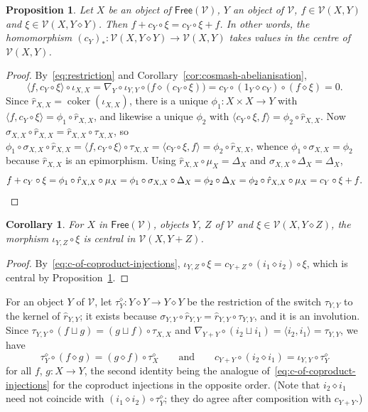 \documentclass[reqno,a4paper]{amsart}
\theoremstyle{plain}
\newtheorem{proposition}[subsection]{Proposition}
\newtheorem{corollary}[subsection]{Corollary}
\theoremstyle{definition}
\newcommand{\V}{\ensuremath{\mathcal{V}}}
\newcommand{\Free}{\ensuremath{\mathsf{Free}}}
\DeclareMathOperator{\coker}{coker}
\newcommand{\cosmash}{\ensuremath{\diamond}}
\newcommand{\cosum}{\ensuremath{\sqcup}}                   %
\newcommand{\cm}[2]{\ensuremath{\hat{r}_{#1,#2}}}          %
\newcommand{\cc}[1]{\ensuremath{c_{#1}}}                    %
\newcommand{\tw}[2]{\ensuremath{\tau_{#1,#2}}}             %
\newcommand{\twp}[2]{\ensuremath{\sigma_{#1,#2}}}          %
\newcommand{\swc}[1]{\ensuremath{\tau^{\cosmash}_{#1}}}          %
\newcommand{\fold}[1]{\ensuremath{\nabla_{#1}}}            %
\newcommand{\diag}[1]{\ensuremath{\Delta_{#1}}}            %
\begin{document}
\begin{proposition}\label{prop:central}
  Let \(X\) be an object of \(\Free(\V)\), \(Y\) an object of \(\V\), \(f\in\V(X,Y)\) and \(\xi\in\V(X,Y\cosmash Y)\). Then \(f+\cc{Y}\circ\xi=\cc{Y}\circ\xi+f\). In other words, the homomorphism \((\cc{Y})_{*}\colon \V(X,Y\cosmash Y)\to\V(X,Y)\) takes values in the centre of \(\V(X,Y)\).
\end{proposition}

\begin{proof}
  By~\eqref{eq:restriction} and Corollary~\ref{cor:cosmash-abelianisation},
  \[
    \langle f,\cc{Y}\circ\xi\rangle\circ\iota_{X,X}=\fold{Y}\circ\iota_{Y,Y}\circ\bigl(f\cosmash(\cc{Y}\circ\xi)\bigr)=\cc{Y}\circ(1_{Y}\cosmash\cc{Y})\circ(f\cosmash\xi)=0\text{.}
  \]
  Since \(\cm{X}{X}=\coker(\iota_{X,X})\), there is a unique \(\phi_{1}\colon X\times X\to Y\) with \(\langle f,\cc{Y}\circ\xi\rangle=\phi_{1}\circ\cm{X}{X}\), and likewise a unique \(\phi_{2}\) with \(\langle\cc{Y}\circ\xi,f\rangle=\phi_{2}\circ\cm{X}{X}\). Now \(\twp{X}{X}\circ\cm{X}{X}=\cm{X}{X}\circ\tw{X}{X}\), so \(\phi_{1}\circ\twp{X}{X}\circ\cm{X}{X}=\langle f,\cc{Y}\circ\xi\rangle\circ\tw{X}{X}=\langle\cc{Y}\circ\xi,f\rangle=\phi_{2}\circ\cm{X}{X}\), whence \(\phi_{1}\circ\twp{X}{X}=\phi_{2}\) because \(\cm{X}{X}\) is an epimorphism. Using \(\cm{X}{X}\circ\mu_{X}=\diag{X}\) and \(\twp{X}{X}\circ\diag{X}=\diag{X}\),
  \[
    f+\cc{Y}\circ\xi=\phi_{1}\circ\cm{X}{X}\circ\mu_{X}=\phi_{1}\circ\twp{X}{X}\circ\diag{X}=\phi_{2}\circ\diag{X}=\phi_{2}\circ\cm{X}{X}\circ\mu_{X}=\cc{Y}\circ\xi+f\text{.}\qedhere
  \]
\end{proof}

\begin{corollary}\label{cor:iota-central}
  For \(X\) in \(\Free(\V)\), objects \(Y\), \(Z\) of \(\V\) and \(\xi\in\V(X,Y\cosmash Z)\), the morphism \(\iota_{Y,Z}\circ\xi\) is central in \(\V(X,Y+Z)\).
\end{corollary}

\begin{proof}
  By~\eqref{eq:c-of-coproduct-injections}, \(\iota_{Y,Z}\circ\xi=\cc{Y+Z}\circ(i_{1}\cosmash i_{2})\circ\xi\), which is central by Proposition~\ref{prop:central}.
\end{proof}

For an object \(Y\) of \(\V\), let \(\swc{Y}\colon Y\cosmash Y\to Y\cosmash Y\) be the restriction of the switch \(\tw{Y}{Y}\) to the kernel of \(\cm{Y}{Y}\); it exists because \(\twp{Y}{Y}\circ\cm{Y}{Y}=\cm{Y}{Y}\circ\tw{Y}{Y}\), and it is an involution. Since \(\tw{Y}{Y}\circ(f\cosum g)=(g\cosum f)\circ\tw{X}{X}\) and \(\fold{Y+Y}\circ(i_{2}\cosum i_{1})=\langle i_{2},i_{1}\rangle=\tw{Y}{Y}\), we have
\begin{equation}\label{eq:switch}
  \swc{Y}\circ(f\cosmash g)=(g\cosmash f)\circ\swc{X}\qquad\text{and}\qquad\cc{Y+Y}\circ(i_{2}\cosmash i_{1})=\iota_{Y,Y}\circ\swc{Y}
\end{equation}
for all \(f\), \(g\colon X\to Y\), the second identity being the analogue of~\eqref{eq:c-of-coproduct-injections} for the coproduct injections in the opposite order. (Note that \(i_{2}\cosmash i_{1}\) need not coincide with \((i_{1}\cosmash i_{2})\circ\swc{Y}\); they do agree after composition with \(\cc{Y+Y}\).)
\end{document}
